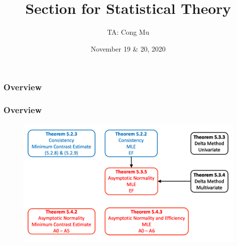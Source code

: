 \documentclass[serif,mathserif,professionalfont]{beamer}
\title[Section for EN.553.730]{Section for Statistical Theory} %
\author{TA: Cong Mu} %
\institute[cmu2@jhu.edu] %
{
Office Hour: Wednesday 09:30AM - 11:30AM
\medskip
\textit{} %
}
\date{November 19 \& 20, 2020} %
\begin{document}
\begin{frame}
\titlepage %
\end{frame}

\begin{frame}
\frametitle{Overview} %
\tableofcontents %
\end{frame}





\begin{frame}
	
	\frametitle{Overview}
	
	\begin{figure}
		\includegraphics[width=1\linewidth]{W12F1}
	\end{figure}
	
	
\end{frame}
\end{document}

